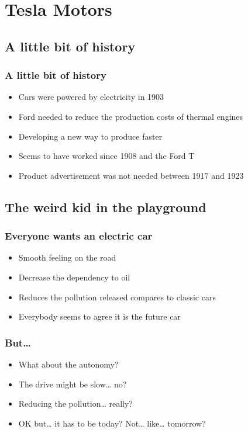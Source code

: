     \section{Tesla Motors}

\subsection{A little bit of history}
\begin{frame}
\frametitle{A little bit of history}
\begin{itemize}
    \itemsep1em
    \item Cars were powered by electricity in 1903
    \item Ford needed to reduce the production costs of thermal engines
    \item Developing a new way to produce faster %
    \item Seems to have worked since 1908 and the Ford T
    \item Product advertisement was not needed between 1917 and 1923
\end{itemize}
\end{frame}

\subsection{The weird kid in the playground}
\begin{frame}
\frametitle{Everyone wants an electric car}
\begin{itemize}
    \itemsep1.5em
    \item Smooth feeling on the road
    \item Decrease the dependency to oil
    \item Reduces the pollution released compares to classic cars
    \item Everybody seems to agree it is the future car
\end{itemize}
\end{frame}

\begin{frame}
\frametitle{But…}
\begin{itemize}
    \itemsep1.5em
    \item What about the autonomy?
    \item The drive might be slow… no?
    \item Reducing the pollution… really? %
    \item OK but… it has to be today? Not… like… tomorrow?
\end{itemize}
\end{frame}

